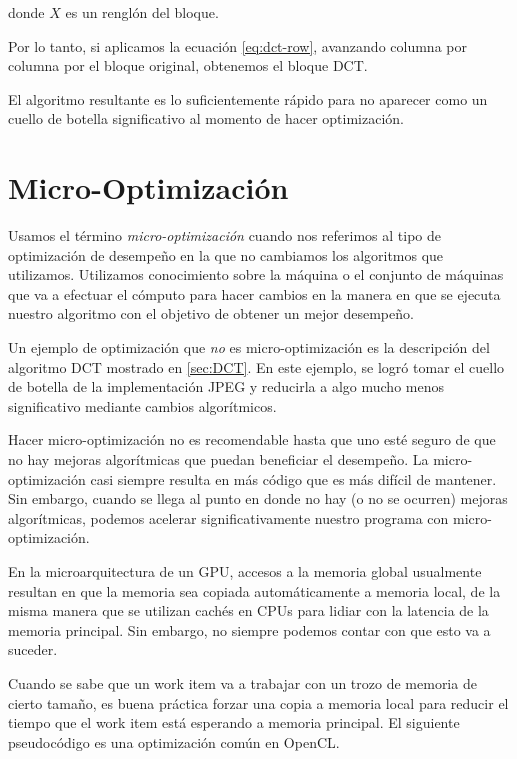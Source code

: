 donde $X$ es un renglón del bloque.

Por lo tanto, si aplicamos la ecuación \ref{eq:dct-row}, avanzando columna por
columna por el bloque original, obtenemos el bloque DCT.

El algoritmo resultante es lo suficientemente rápido para no aparecer como un
cuello de botella significativo al momento de hacer optimización.


\section{Micro-Optimización} \label{sec:microopt}


Usamos el término \emph{micro-optimización} cuando nos referimos al tipo de
optimización de desempeño en la que no cambiamos los algoritmos que utilizamos.
Utilizamos conocimiento sobre la máquina o el conjunto de máquinas que va a
efectuar el cómputo para hacer cambios en la manera en que se ejecuta nuestro
algoritmo con el objetivo de obtener un mejor desempeño.

Un ejemplo de optimización que \emph{no} es micro-optimización es la
descripción del algoritmo DCT mostrado en \ref{sec:DCT}. En este ejemplo, se
logró tomar el cuello de botella de la implementación JPEG y reducirla a algo
mucho menos significativo mediante cambios algorítmicos.

Hacer micro-optimización no es recomendable hasta que uno esté seguro de que no
hay mejoras algorítmicas que puedan beneficiar el desempeño. La
micro-optimización casi siempre resulta en más código que es más difícil de
mantener. Sin embargo, cuando se llega al punto en donde no hay (o no se
ocurren) mejoras algorítmicas, podemos acelerar significativamente nuestro
programa con micro-optimización.

En la microarquitectura de un GPU, accesos a la memoria global usualmente
resultan en que la memoria sea copiada automáticamente a memoria local, de la
misma manera que se utilizan cachés en CPUs para lidiar con la latencia de la
memoria principal. Sin embargo, no siempre podemos contar con que esto va a
suceder.

Cuando se sabe que un work item va a trabajar con un trozo de memoria de cierto
tamaño, es buena práctica forzar una copia a memoria local para reducir el
tiempo que el work item está esperando a memoria principal. El siguiente
pseudocódigo es una optimización común en OpenCL.

